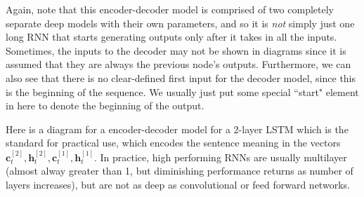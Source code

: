 \documentclass{article}
\begin{document}
\begin{figure}[H]
    \caption{} 
    \label{fig:encoder_decoder_rnn}
  \end{figure}

  Again, note that this encoder-decoder model is comprised of two completely separate deep models with their own parameters, and so it is \textit{not} simply just one long RNN that starts generating outputs only after it takes in all the inputs. Sometimes, the inputs to the decoder may not be shown in diagrams since it is assumed that they are always the previous node's outputs. Furthermore, we can also see that there is no clear-defined first input for the decoder model, since this is the beginning of the sequence. We usually just put some special ``start" element in here to denote the beginning of the output. 

  Here is a diagram for a encoder-decoder model for a 2-layer LSTM which is the standard for practical use, which encodes the sentence meaning in the vectors $\mathbf{c}_t^{[2]}, \mathbf{h}_t ^{[2]}, \mathbf{c}_t^{[1]}, \mathbf{h}_t^{[1]}$. In practice, high performing RNNs are usually multilayer (almost alway greater than 1, but diminishing performance returns as number of layers increases), but are not as deep as convolutional or feed forward networks. 
\end{document}
